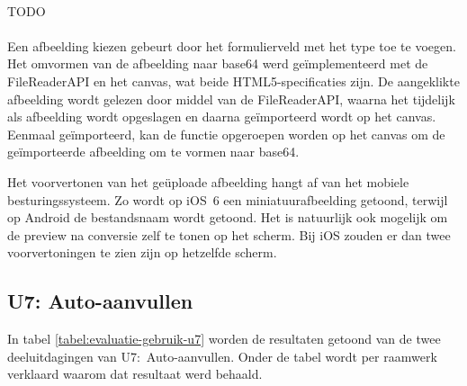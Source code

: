 \paragraph{\kendo}
TODO

\paragraph{\lungo}
Een afbeelding kiezen gebeurt door het formulierveld met het type  toe te voegen.
Het omvormen van de afbeelding naar base64 werd geïmplementeerd met de FileReaderAPI en het canvas, wat beide HTML5-specificaties zijn. 
De aangeklikte afbeelding wordt gelezen door middel van de FileReaderAPI, waarna het tijdelijk als afbeelding wordt opgeslagen en daarna geïmporteerd wordt op het canvas. 
Eenmaal geïmporteerd, kan de functie  opgeroepen worden op het canvas om de geïmporteerde afbeelding om te vormen naar base64. 

Het voorvertonen van het geüploade afbeelding hangt af van het mobiele besturingssysteem.
Zo wordt op iOS~6 een miniatuurafbeelding getoond, terwijl op Android de bestandsnaam wordt getoond.
Het is natuurlijk ook mogelijk om de preview na conversie zelf te tonen op het scherm.
Bij iOS zouden er dan twee voorvertoningen te zien zijn op hetzelfde scherm.

\subsection{U7: Auto-aanvullen}
In tabel \ref{tabel:evaluatie-gebruik-u7} worden de resultaten getoond van de twee deeluitdagingen van U7:~Auto-aanvullen.
Onder de tabel wordt per raamwerk verklaard waarom dat resultaat werd behaald.

\begin{table}[H]
\centering
{}
\caption{Gebruik voor U7: Auto-aanvullen}
\label{tabel:evaluatie-gebruik-u7}
\end{table}

